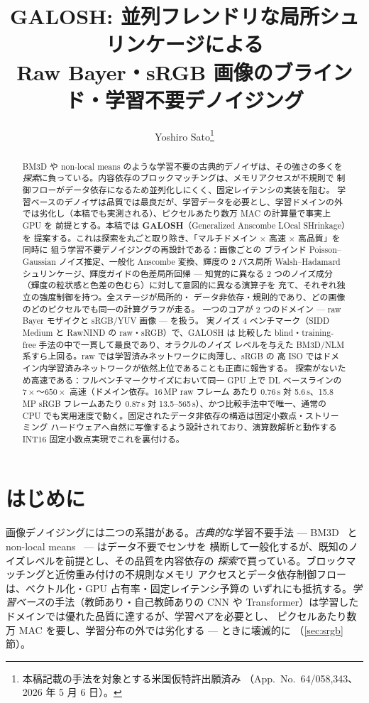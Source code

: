 \documentclass[10pt,twocolumn]{article}
\title{\textbf{GALOSH: 並列フレンドリな局所シュリンケージによる\\
Raw Bayer・sRGB 画像のブラインド・学習不要デノイジング}}
\author{Yoshiro Sato\thanks{本稿記載の手法を対象とする米国仮特許出願済み
（App.\ No.\ 64/058,343、2026 年 5 月 6 日）。}}
\date{}
\begin{document}
\maketitle

\begin{abstract}
BM3D や non-local means のような学習不要の古典的デノイザは、その強さの多くを
\emph{探索}に負っている。内容依存のブロックマッチングは、メモリアクセスが不規則で
制御フローがデータ依存になるため並列化しにくく、固定レイテンシの実装を阻む。
学習ベースのデノイザは品質では最良だが、学習データを必要とし、学習ドメインの外
では劣化し（本稿でも実測される）、ピクセルあたり数万 MAC の計算量で事実上 GPU を
前提とする。本稿では \textbf{GALOSH}（Generalized Anscombe LOcal SHrinkage）を
提案する。これは探索を丸ごと取り除き、「マルチドメイン × 高速 × 高品質」を同時に
狙う学習不要デノイジングの再設計である：画像ごとの
ブラインド Poisson--Gaussian ノイズ推定、一般化 Anscombe 変換、輝度の 2 パス局所
Walsh--Hadamard シュリンケージ、輝度ガイドの色差局所回帰 --- 知覚的に異なる
2 つのノイズ成分（輝度の粒状感と色差の色むら）に対して意図的に異なる演算子を
充て、それぞれ独立の強度制御を持つ。全ステージが局所的・
データ非依存・規則的であり、どの画像のどのピクセルでも同一の計算グラフが走る。
一つのコアが 2 つのドメイン --- raw Bayer モザイクと sRGB/YUV 画像 --- を扱う。
実ノイズ 4 ベンチマーク（SIDD Medium と RawNIND の raw・sRGB）で、GALOSH は
比較した blind・training-free 手法の中で一貫して最良であり、オラクルのノイズ
レベルを与えた BM3D/NLM 系すら上回る。raw では学習済みネットワークに肉薄し、sRGB の
高 ISO ではドメイン内学習済みネットワークが依然上位であることも正直に報告する。
探索がないため高速である：フルベンチマークサイズにおいて同一 GPU 上で DL
ベースラインの $7\times$〜$650\times$ 高速（ドメイン依存。16\,MP raw フレーム
あたり 0.76\,s 対 5.6\,s、15.8\,MP sRGB フレームあたり 0.87\,s 対
13.5--565\,s）、かつ比較手法中で唯一、通常の CPU でも実用速度で動く。固定されたデータ非依存の構造は固定小数点・ストリーミング
ハードウェアへ自然に写像するよう設計されており、演算数解析と動作する INT16
固定小数点実現でこれを裏付ける。
\end{abstract}

\section{はじめに}
画像デノイジングには二つの系譜がある。\emph{古典的}な学習不要手法 ---
BM3D~\cite{bm3d} と non-local means~\cite{nlm} --- はデータ不要でセンサを
横断して一般化するが、既知のノイズレベルを前提とし、その品質を内容依存の
\emph{探索}で買っている。ブロックマッチングと近傍重み付けの不規則なメモリ
アクセスとデータ依存制御フローは、ベクトル化・GPU 占有率・固定レイテンシ予算の
いずれにも抵抗する。\emph{学習ベース}の手法（教師あり・自己教師ありの CNN や
Transformer）は学習したドメインでは優れた品質に達するが、学習ペアを必要とし、
ピクセルあたり数万 MAC を要し、学習分布の外では劣化する --- ときに壊滅的に
（\ref{sec:srgb}節）。
\end{document}
